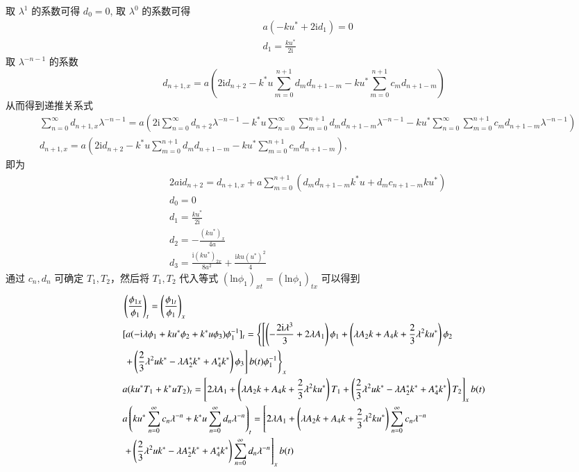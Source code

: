 取 $\lambda^1$ 的系数可得 $d_0=0$, 取 $\lambda^0$ 的系数可得
\begin{align}
	&a(-ku^*+2\mathrm{i}d_1)=0\nonumber\\
	&d_1=\frac{ku^*}{2\mathrm{i}}\nonumber
\end{align}
取 $\lambda^{-n-1}$ 的系数
\begin{equation}
  d_{n+1,x} = a\left(2\mathrm{i}d_{n+2} - k^{*}u\sum_{m=0}^{n+1}d_{m}d_{n+1-m} - ku^{*}\sum_{m=0}^{n+1}c_{m}d_{n+1-m}\right)
\end{equation}
从而得到递推关系式
\begin{align}
	&\sum_{n=0}^{\infty}d_{n+1,x}\lambda^{-n-1}=a\left(2\mathrm{i} \sum_{n=0}^{\infty}d_{n+2}\lambda^{-n-1}-k^*u\sum_{n=0}^{\infty}\sum_{m=0}^{n+1}d_md_{n+1-m}\lambda^{-n-1}-ku^*\sum_{n=0}^{\infty}\sum_{m=0}^{n+1}c_md_{n+1-m}\lambda^{-n-1}\right)\nonumber\\
	&d_{n+1,x}=a\left(2\mathrm{i}d_{n+2}-k^*u\sum_{m=0}^{n+1}d_md_{n+1-m}-ku^*\sum_{m=0}^{n+1}c_md_{n+1-m}\right),\nonumber
\end{align}
即为
\begin{align}
  & 2a\mathrm{i}d_{n+2} = d_{n+1,x} + a\sum_{m=0}^{n+1}(d_{m}d_{n+1-m}k^{*}u + d_{m}c_{n+1-m}ku^{*}) \\
  & d_{0} = 0 \\
  & d_{1} = \frac{ku^{*}}{2\mathrm{i}} \\
  & d_{2} = -\frac{(ku^{*})_{x}}{4a} \\
  & d_{3} = \frac{\mathrm{i}(ku^{*})_{2x}}{8a^{2}} + \frac{\mathrm{i}ku(u^{*})^{2}}{4}
\end{align}
通过 $c_{n}, d_{n}$ 可确定 $T_{1}, T_{2}$，然后将 $T_{1}, T_{2}$ 代入等式 $(\mathrm{ln} \phi_{1})_{xt} = (\mathrm{ln} \phi_{1})_{tx}$ 可以得到
\begin{align}
  & \left(\frac{\phi_{1x}}{\phi_{1}}\right)_{t} = \left(\frac{\phi_{1t}}{\phi_{1}}\right)_{x} \\
  & [a(-\mathrm{i}\lambda\phi_{1} + ku^{*}\phi_{2} +k^{*}u\phi_{3})\phi_{1}^{-1}]_{t} = \left\{\left[\left(-\frac{2\mathrm{i}\lambda^{3}}{3}+2\lambda A_{1}\right)\phi_{1} + \left(\lambda A_{2}k+A_{4}k+\frac{2}{3}\lambda^{2}ku^{*}\right)\phi_{2} \right.\right. \notag\\
  & \left.\left. + \left(\frac{2}{3}\lambda^{2}uk^{*}-\lambda A_{2}^{*}k^{*}+A_{4}^{*}k^{*}\right)\phi_{3}\right]b(t)\phi_{1}^{-1}\right\}_{x} \\
  & a(ku^{*}T_{1} + k^{*}uT_{2})_{t} = \left[2\lambda A_{1} + \left(\lambda A_{2}k+A_{4}k+\frac{2}{3}\lambda^{2}ku^{*}\right)T_{1} + \left(\frac{2}{3}\lambda^{2}uk^{*}-\lambda A_{2}^{*}k^{*}+A_{4}^{*}k^{*}\right)T_{2}\right]_{x}b(t) \\
  & a\left(ku^{*}\sum_{n=0}^{\infty}c_{n}\lambda^{-n} + k^{*}u\sum_{n=0}^{\infty}d_{n}\lambda^{-n}\right)_{t} = \left[2\lambda A_{1} + \left(\lambda A_{2}k+A_{4}k+\frac{2}{3}\lambda^{2}ku^{*}\right)\sum_{n=0}^{\infty}c_{n}\lambda^{-n} \right. \notag\\
  & \left. + \left(\frac{2}{3}\lambda^{2}uk^{*}-\lambda A_{2}^{*}k^{*}+A_{4}^{*}k^{*}\right)\sum_{n=0}^{\infty}d_{n}\lambda^{-n}\right]_{x}b(t)
\end{align}
